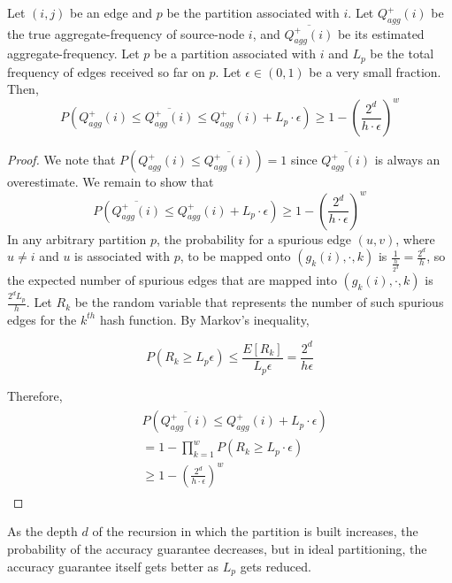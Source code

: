 \begin{theorem}
Let $(i,j)$ be an edge and $p$ be the partition associated with $i$. Let $Q_{agg}^{+}(i)$ be the true aggregate-frequency of source-node $i$, and $\overline{Q_{agg}^{+}(i)}$ be its estimated aggregate-frequency. Let $p$ be a partition associated with $i$ and $L_p$ be the total frequency of edges received so far on $p$. Let $\epsilon \in (0,1)$ be a very small fraction. Then,
\[
P(Q_{agg}^{+}(i) \leq \overline{Q_{agg}^{+}(i)} \leq Q_{agg}^{+}(i) + L_p \cdot \epsilon) \geq 1-(\frac{2^d}{h\cdot\epsilon})^w
\]
\end{theorem}

\begin{proof}
We note that $P(Q_{agg}^{+}(i) \leq \overline{Q_{agg}^{+}(i)}) = 1$ since $\overline{Q_{agg}^{+}(i)}$ is always an overestimate. We remain to show that
\[
P(\overline{Q_{agg}^{+}(i)} \leq Q_{agg}^{+}(i) + L_p \cdot \epsilon) \geq 1-(\frac{2^d}{h\cdot\epsilon})^w
\]
In any arbitrary partition $p$, the probability for a spurious edge $(u,v)$, where $u \neq i$ and $u$ is associated with $p$, to be mapped onto $(g_k(i),\cdot,k)$ is $\frac{1}{\frac{h}{2^d}} = \frac{2^d}{h}$, so the expected number of spurious edges that are mapped into $(g_k(i),\cdot,k)$ is $\frac{2^dL_p}{h}$. Let $R_k$ be the random variable that represents the number of such spurious edges for the $k^{th}$ hash function. By Markov's inequality,

\begin{equation} \label{agg21}
  P(R_k \geq L_p \epsilon) \leq \frac{E[R_k]}{L_p \epsilon} = \frac{2^d}{h\epsilon}
\end{equation}

Therefore,
\begin{align}
\begin{split}
&  P(\overline{Q_{agg}^{+}(i)} \leq Q_{agg}^{+}(i) + L_p \cdot \epsilon)
\\  &= 1 - \prod _{k=1}^{w}P(R_k \geq L_p \cdot \epsilon)
\\  &\geq 1-(\frac{2^d}{h\cdot\epsilon})^w
\end{split}
\end{align}

\end{proof}

\begin{remarks}
As the depth $d$ of the recursion in which the partition is built increases, the probability of the accuracy guarantee decreases, but in ideal partitioning, the accuracy guarantee itself gets better as $L_p$ gets reduced.
\end{remarks}

